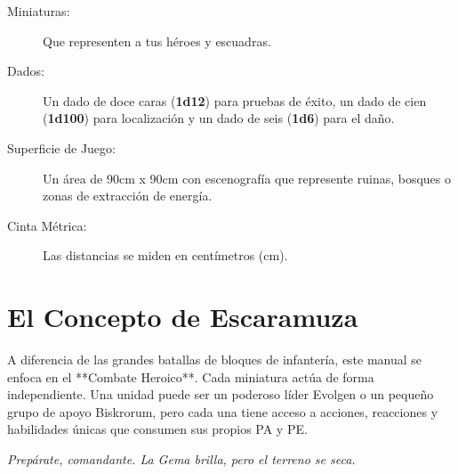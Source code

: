\begin{description}
    \item[Miniaturas:] Que representen a tus héroes y escuadras.
    \item[Dados:] Un dado de doce caras (\textbf{1d12}) para pruebas de éxito, un dado de cien (\textbf{1d100}) para localización y un dado de seis (\textbf{1d6}) para el daño.
    \item[Superficie de Juego:] Un área de 90cm x 90cm con escenografía que represente ruinas, bosques o zonas de extracción de energía.
    \item[Cinta Métrica:] Las distancias se miden en centímetros (cm).
\end{description}

\section{El Concepto de Escaramuza}
A diferencia de las grandes batallas de bloques de infantería, este manual se enfoca en el **Combate Heroico**. Cada miniatura actúa de forma independiente. Una unidad puede ser un poderoso líder Evolgen o un pequeño grupo de apoyo Biskrorum, pero cada una tiene acceso a acciones, reacciones y habilidades únicas que consumen sus propios PA y PE.

\vfill
\begin{center}
    \textit{Prepárate, comandante. La Gema brilla, pero el terreno se seca.}
\end{center}